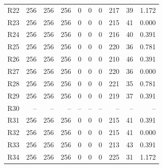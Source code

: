 \begin{longtable}{lrrrrrrrrr}
R22 & 256 & 256 & 256 & 0 & 0 & 0 & 217 & 39 & 1.172\\
R23 & 256 & 256 & 256 & 0 & 0 & 0 & 215 & 41 & 0.000\\
R24 & 256 & 256 & 256 & 0 & 0 & 0 & 216 & 40 & 0.391\\
R25 & 256 & 256 & 256 & 0 & 0 & 0 & 220 & 36 & 0.781\\
R26 & 256 & 256 & 256 & 0 & 0 & 0 & 210 & 46 & 0.391\\
R27 & 256 & 256 & 256 & 0 & 0 & 0 & 220 & 36 & 0.000\\
R28 & 256 & 256 & 256 & 0 & 0 & 0 & 221 & 35 & 0.781\\
R29 & 256 & 256 & 256 & 0 & 0 & 0 & 219 & 37 & 0.391\\
R30 & -- & -- & -- & -- & -- & -- & -- & -- & --\\
R31 & 256 & 256 & 256 & 0 & 0 & 0 & 215 & 41 & 0.391\\
R32 & 256 & 256 & 256 & 0 & 0 & 0 & 215 & 41 & 0.000\\
R33 & 256 & 256 & 256 & 0 & 0 & 0 & 213 & 43 & 0.391\\
R34 & 256 & 256 & 256 & 0 & 0 & 0 & 225 & 31 & 1.172\\
\end{longtable}
\clearpage
